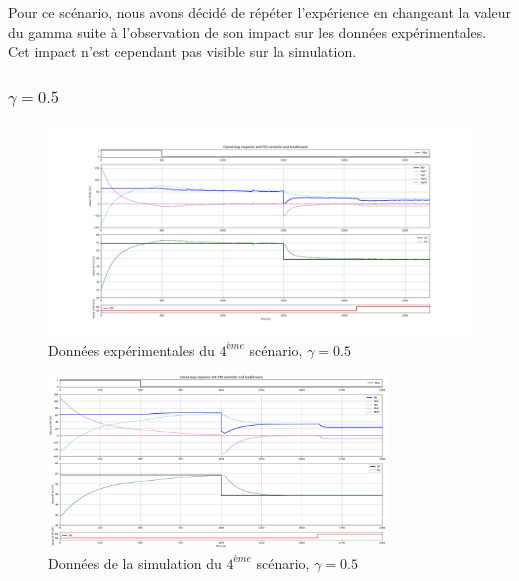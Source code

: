 Pour ce scénario, nous avons décidé de répéter l'expérience en changeant la valeur du gamma suite à l'observation de son impact sur les données expérimentales.
Cet impact n'est cependant pas visible sur la simulation.

\subsubsection{$\gamma = 0.5$}

\begin{figure}[H]
	\centering
	\includegraphics[width=1\textwidth]{../Plots/Experiment_scenario_7_2024-03-29-17h44.png}
	\caption{Données expérimentales du $4^{ème}$ scénario, $\gamma = 0.5$}
	\label{fig:exp_scenario5_0.5}
\end{figure}
\begin{figure}[H]
	\centering
	\includegraphics[width=0.8\textwidth]{figures/scenario7.png}
	\caption{Données de la simulation du $4^{ème}$ scénario, $\gamma = 0.5$}
	\label{fig:sim_scenario5_0.5}
\end{figure}

